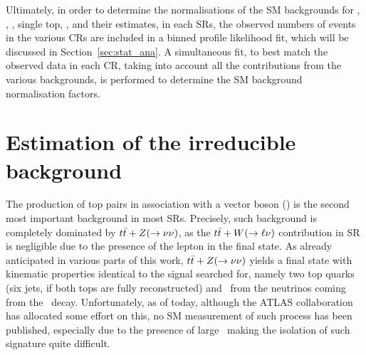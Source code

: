 		Ultimately, in order to determine the normalisations of the \ac{SM} backgrounds for \Zboson, \ttbar, \Wboson, single top, \ttZ, and their estimates, in each \acp{SR}, the observed numbers of events in the various \acp{CR} are included in a binned profile likelihood fit, which will be discussed in Section~\ref{sec:stat_ana}. A simultaneous fit, to best match the observed data in each \ac{CR}, taking into account all the contributions from the various backgrounds, is performed to determine the \ac{SM} background normalisation factors. 


	\section{Estimation of the \protect{\ttZ} irreducible background}
	\label{sec:ddbkgest}

		The production of top pairs in association with a vector boson (\ttV) is the second most important background in most \acp{SR}. Precisely, such background is completely dominated by $t\bar{t}+Z(\rightarrow \nu\nu)$, as the $t\bar{t}+W(\rightarrow \ell \nu)$ contribution in \ac{SR} is negligible due to the presence of the lepton in the final state. As already anticipated in various parts of this work, $t\bar{t}+Z(\rightarrow \nu\nu)$ yields a final state with kinematic properties identical to the signal searched for, namely two top quarks (six jets, if both tops are fully reconstructed) and \met\ from the neutrinos coming from the \Zboson\ decay. Unfortunately, as of today, although the \ac{ATLAS} collaboration has allocated some effort on this, no \ac{SM} measurement of such process has been published, especially due to the presence of large \met\ making the isolation of such signature quite difficult.


